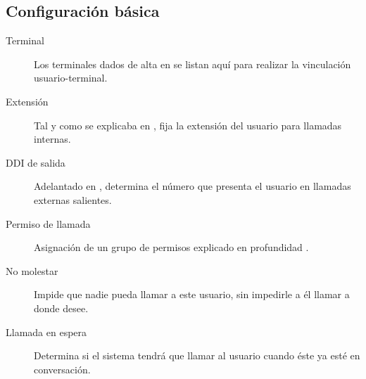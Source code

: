 \documentclass[letterpaper,10pt,spanish]{sphinxmanual}
\begin{document}
\subsection{Configuración básica}
\label{pbx_features/users:configuracion-basica}
\noindent{}
\begin{description}
\item[{Terminal}] \leavevmode{}\label{pbx_features/users:term-terminal}
Los terminales dados de alta en {\hyperref[pbx_features/terminals:terminals]{}} se listan aquí para realizar la vinculación usuario-terminal.

\item[{Extensión}] \leavevmode{}\label{pbx_features/users:term-extension}
Tal y como se explicaba en {\hyperref[pbx_features/extensions:extensions]{}}, fija la extensión del usuario para llamadas internas.

\item[{DDI de salida}] \leavevmode{}\label{pbx_features/users:term-ddi-de-salida}
Adelantado en {\hyperref[external_outgoing_calls/external_ddi:external\string-ddi]{}}, determina el número que presenta el usuario en llamadas externas salientes.

\item[{Permiso de llamada}] \leavevmode{}\label{pbx_features/users:term-permiso-de-llamada}
Asignación de un grupo de permisos explicado en profundidad {\hyperref[pbx_features/call_permissions:call\string-permissions]{}}.

\item[{No molestar}] \leavevmode{}\label{pbx_features/users:term-no-molestar}
Impide que nadie pueda llamar a este usuario, sin impedirle a él llamar a donde desee.

\item[{Llamada en espera}] \leavevmode{}\label{pbx_features/users:term-llamada-en-espera}
Determina si el sistema tendrá que llamar al usuario cuando éste ya esté en conversación.

\end{description}
\end{document}
